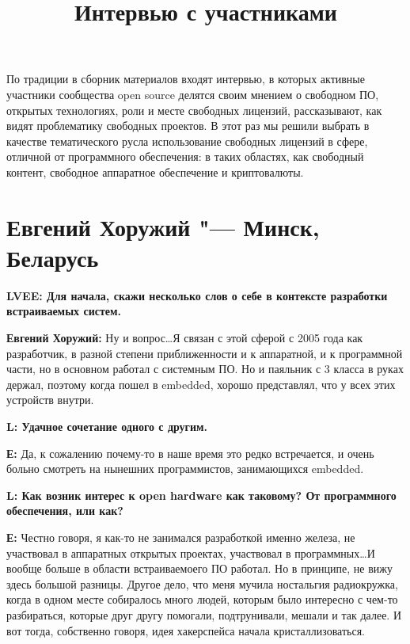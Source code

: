 \documentclass[10pt, a5paper]{article}
\begin{document}
\title{Интервью с участниками}
\date{}
\maketitle

По традиции в сборник материалов входят интервью, в которых активные участники
сообщества open source делятся своим мнением о свободном ПО, открытых
технологиях, роли и месте свободных лицензий, рассказывают, как видят проблематику
свободных проектов. В этот раз мы решили выбрать в качестве тематического русла
использование свободных лицензий в сфере, отличной от программного обеспечения:
в таких областях, как свободный контент, свободное аппаратное обеспечение и криптовалюты.

\section{Евгений Хоружий "---  Минск, Беларусь}

{\noindent \bf LVEE: Для начала, скажи несколько слов о себе в контексте разработки встраиваемых систем.}

{\noindent \bf Евгений Хоружий:} Ну и вопрос\ldots Я связан с этой сферой с 2005 года как разработчик, в разной степени приближенности и к аппаратной, и к программной части, но в основном работал с системным ПО. Но и паяльник с 3 класса в руках держал, поэтому когда пошел в embedded, хорошо представлял, что у всех этих устройств внутри.

{\noindent \bf L: Удачное сочетание одного с другим.}

{\noindent \bf Е:} Да, к сожалению почему-то в наше время это редко встречается, и очень больно смотреть на нынешних программистов, занимающихся embedded.

{\noindent \bf L: Как возник интерес к open hardware как таковому? От программного обеспечения, или как?} 

{\noindent \bf Е:}  Честно говоря, я как-то не занимался разработкой именно железа, не участвовал в аппаратных открытых проектах, участвовал в программных\ldots И вообще больше в области встраиваемоего ПО работал. Но в принципе, не вижу здесь большой разницы. Другое дело, что меня мучила ностальгия радиокружка, когда в одном месте собиралось много людей, которым было интересно с чем-то разбираться, которые друг другу помогали, подтрунивали, мешали и так далее. И вот тогда, собственно говоря, идея хакерспейса начала кристаллизоваться. 
\end{document}
